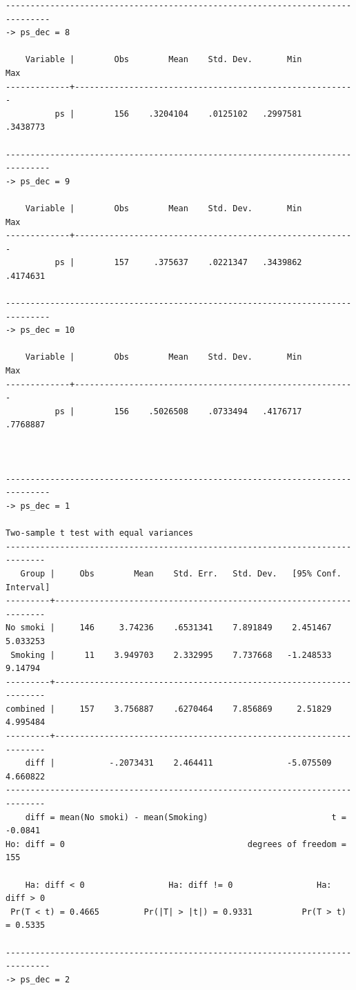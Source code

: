 \documentclass[
  10pt,
]{book}
\begin{document}
\begin{verbatim}
-------------------------------------------------------------------------------
-> ps_dec = 8

    Variable |        Obs        Mean    Std. Dev.       Min        Max
-------------+---------------------------------------------------------
          ps |        156    .3204104    .0125102   .2997581   .3438773

-------------------------------------------------------------------------------
-> ps_dec = 9

    Variable |        Obs        Mean    Std. Dev.       Min        Max
-------------+---------------------------------------------------------
          ps |        157     .375637    .0221347   .3439862   .4174631

-------------------------------------------------------------------------------
-> ps_dec = 10

    Variable |        Obs        Mean    Std. Dev.       Min        Max
-------------+---------------------------------------------------------
          ps |        156    .5026508    .0733494   .4176717   .7768887



-------------------------------------------------------------------------------
-> ps_dec = 1

Two-sample t test with equal variances
------------------------------------------------------------------------------
   Group |     Obs        Mean    Std. Err.   Std. Dev.   [95% Conf. Interval]
---------+--------------------------------------------------------------------
No smoki |     146     3.74236    .6531341    7.891849    2.451467    5.033253
 Smoking |      11    3.949703    2.332995    7.737668   -1.248533     9.14794
---------+--------------------------------------------------------------------
combined |     157    3.756887    .6270464    7.856869     2.51829    4.995484
---------+--------------------------------------------------------------------
    diff |           -.2073431    2.464411               -5.075509    4.660822
------------------------------------------------------------------------------
    diff = mean(No smoki) - mean(Smoking)                         t =  -0.0841
Ho: diff = 0                                     degrees of freedom =      155

    Ha: diff < 0                 Ha: diff != 0                 Ha: diff > 0
 Pr(T < t) = 0.4665         Pr(|T| > |t|) = 0.9331          Pr(T > t) = 0.5335

-------------------------------------------------------------------------------
-> ps_dec = 2


\end{verbatim}
\end{document}
